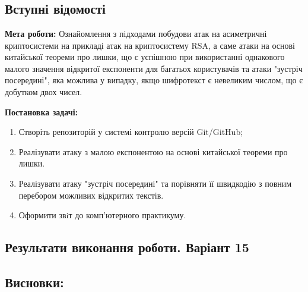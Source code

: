 \chapter{}
\section{Вступні відомості}
\noindent\textbf{Мета роботи:} Ознайомлення з підходами побудови атак на асиметричні криптосистеми на прикладі атак на криптосистему 
RSA, а саме атаки на основі китайської теореми про лишки, що є успішною при використанні однакового малого значення відкритої експоненти 
для багатьох користувачів та атаки "зустріч посередині"{}, яка можлива у випадку, якщо шифротекст є невеликим числом, що є добутком двох чисел.

\noindent\textbf{Постановка задачі:}
\begin{enumerate}
    \item Створіть репозиторій у системі контролю версій Git/GitHub;
    \item Реалізувати атаку з малою експонентою на основі китайської теореми про лишки.
    \item Реалізувати атаку "зустріч посередині"{} та порівняти її швидкодію з повним перебором можливих відкритих текстів.
    \item Оформити звiт до комп’ютерного практикуму.
\end{enumerate}
\section{Результати виконання роботи. Варіант 15}


\section{Висновки:}
